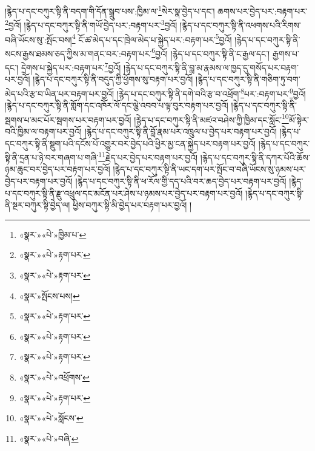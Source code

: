 །རྙེད་པ་དང་བཀུར་སྟི་ནི་བདག་གི་དོན་སྒྲུབ་པས་:ཁྱིམ་ལ་\footnote{«སྣར་»«པེ་»ཁྱིམ་པ་}སེར་སྣ་བྱེད་པ་དང་། ཆགས་པར་བྱེད་པར་:བརྟག་པར་\footnote{«སྣར་»«པེ་»རྟག་པར་}བྱའོ། །རྙེད་པ་དང་བཀུར་སྟི་ནི་གཡོ་བྱེད་པར་:བརྟག་པར་\footnote{«སྣར་»«པེ་»རྟག་པར་}བྱའོ། །རྙེད་པ་དང་བཀུར་སྟི་ནི་འཕགས་པའི་རིགས་བཞི་ཡོངས་སུ་:སྤོང་བས།\footnote{«སྣར་»སྤོངས་པས།} ངོ་ཚ་མེད་པ་དང་ཁྲེལ་མེད་པ་སྐྱེད་པར་:བརྟག་པར་\footnote{«སྣར་»«པེ་»རྟག་པར་}བྱའོ། །རྙེད་པ་དང་བཀུར་སྟི་ནི་སངས་རྒྱས་ཐམས་ཅད་ཀྱིས་མ་གནང་བར་:བརྟག་པར་\footnote{«སྣར་»«པེ་»རྟག་པར་}བྱའོ། །རྙེད་པ་དང་བཀུར་སྟི་ནི་ང་རྒྱལ་དང་། རྒྱགས་པ་དང་། དྲེགས་པ་སྐྱེད་པར་:བརྟག་པར་\footnote{«སྣར་»«པེ་»རྟག་པར་}བྱའོ། །རྙེད་པ་དང་བཀུར་སྟི་ནི་བླ་མ་རྣམས་ལ་ཁྱད་དུ་གསོད་པར་བརྟག་པར་བྱའོ། །རྙེད་པ་དང་བཀུར་སྟི་ནི་བདུད་ཀྱི་ཕྱོགས་སུ་བརྟག་པར་བྱའོ། །རྙེད་པ་དང་བཀུར་སྟི་ནི་གཅིག་ཏུ་བག་མེད་པའི་རྩ་བ་ཡིན་པར་བརྟག་པར་བྱའོ། །རྙེད་པ་དང་བཀུར་སྟི་ནི་དགེ་བའི་རྩ་བ་འཕྲོག་\footnote{«སྣར་»«པེ་»འཕྲོགས་}པར་:བརྟག་པར་\footnote{«སྣར་»«པེ་»རྟག་པར་}བྱའོ། །རྙེད་པ་དང་བཀུར་སྟི་ནི་གློག་དང་འཁོར་ལོ་དང་ལྕེ་འབབ་པ་ལྟ་བུར་བརྟག་པར་བྱའོ། །རྙེད་པ་དང་བཀུར་སྟི་ནི་སྦགས་པ་མང་པོར་སྦགས་པར་བརྟག་པར་བྱའོ། །རྙེད་པ་དང་བཀུར་སྟི་ནི་མཛའ་བཤེས་ཀྱི་ཁྱིམ་དང་སློང་\footnote{«སྣར་»«པེ་»སློངས་}མོ་སྟེར་བའི་ཁྱིམ་ལ་བརྟག་པར་བྱའོ། །རྙེད་པ་དང་བཀུར་སྟི་ནི་བློ་རྣམ་པར་འཁྲུལ་པ་བྱེད་པར་བརྟག་པར་བྱའོ། །རྙེད་པ་དང་བཀུར་སྟི་ནི་སྡུག་པའི་དངོས་པོ་འགྱུར་བར་བྱེད་པའི་ཕྱིར་མྱ་ངན་སྐྱེད་པར་བརྟག་པར་བྱའོ། །རྙེད་པ་དང་བཀུར་སྟི་ནི་དྲན་པ་ཉེ་བར་གཞག་པ་གཞི་\footnote{«སྣར་»«པེ་»བཞི་}རྗེད་པར་བྱེད་པར་བརྟག་པར་བྱའོ། །རྙེད་པ་དང་བཀུར་སྟི་ནི་དཀར་པོའི་ཆོས་ཉམ་ཆུང་བར་བྱེད་པར་བརྟག་པར་བྱའོ། །རྙེད་པ་དང་བཀུར་སྟི་ནི་ཡང་དག་པར་སྤོང་བ་བཞི་ཡོངས་སུ་ཉམས་པར་བྱེད་པར་བརྟག་པར་བྱའོ། །རྙེད་པ་དང་བཀུར་སྟི་ནི་ཕ་རོལ་གྱི་དད་པའི་བར་ཆད་བྱེད་པར་བརྟག་པར་བྱའོ། །རྙེད་པ་དང་བཀུར་སྟི་ནི་རྫུ་འཕྲུལ་དང་མངོན་པར་ཤེས་པ་ཉམས་པར་བྱེད་པར་བརྟག་པར་བྱའོ། །རྙེད་པ་དང་བཀུར་སྟི་ནི་སྔར་བཀུར་སྟི་བྱེད་ལ། ཕྱིས་བཀུར་སྟི་མི་བྱེད་པར་བརྟག་པར་བྱའོ། །
